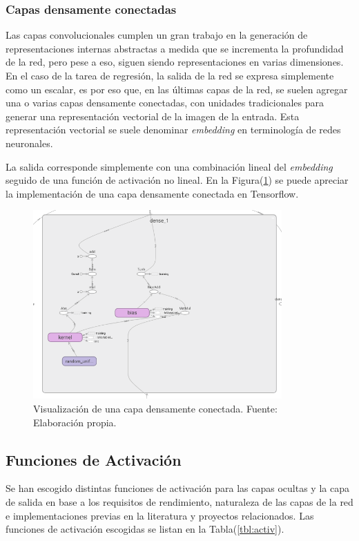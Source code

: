         \subsubsection{Capas densamente conectadas}
        Las capas convolucionales cumplen un gran trabajo en la generación de representaciones internas abstractas a medida 
        que se incrementa la profundidad de la red, pero pese a eso, siguen siendo representaciones en varias dimensiones. En 
        el caso de la tarea de regresión, la salida de la red se expresa simplemente como un escalar, es por eso que, 
        en las últimas capas de la red, se suelen agregar una o varias capas densamente conectadas, con unidades tradicionales 
        para generar una representación vectorial de la imagen de la entrada. Esta representación vectorial se suele denominar 
        \textit{embedding} en terminología de redes neuronales. 
        
        La salida corresponde simplemente con una combinación lineal del \textit{embedding} seguido de una función 
        de activación no lineal. En la Figura(\ref{fig:densetf}) se puede apreciar la implementación de una capa densamente conectada 
        en Tensorflow.

         \begin{figure}[!ht] 
            \centering
            \includegraphics[width=0.85\textwidth]{img/densetf}
            \caption[Visualización de una capa densamente conectada]{Visualización de una capa densamente conectada. Fuente: Elaboración propia. }
            \label{fig:densetf}
        \end{figure}


    \subsection{Funciones de Activación}
    Se han escogido distintas funciones de activación para las capas ocultas y la capa de salida en base a los requisitos de 
    rendimiento, naturaleza de las capas de la red e implementaciones previas en la literatura y proyectos relacionados. 
    Las funciones de activación escogidas se listan en la Tabla(\ref{tbl:activ}). 

